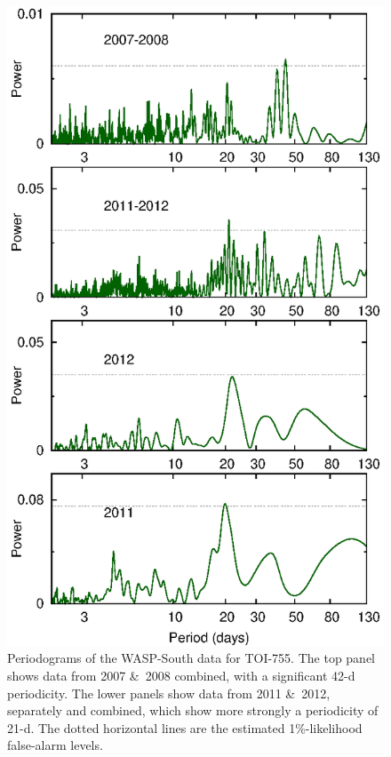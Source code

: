 \documentclass[fleqn,usenatbib]{mnras}
\begin{document}
\begin{figure}
\centering
\includegraphics[width=\columnwidth]{toi755_wasp.eps}
  \caption{Periodograms of the WASP-South data for TOI-755. The top panel shows data from 2007 \&\ 2008 combined, with a significant 42-d periodicity. The lower panels show data from 2011 \&\ 2012, separately and combined, which show more strongly a periodicity of 21-d. The dotted horizontal lines are the estimated 1\%-likelihood false-alarm levels.}
\label{fig:wasp}
\end{figure}
\end{document}
